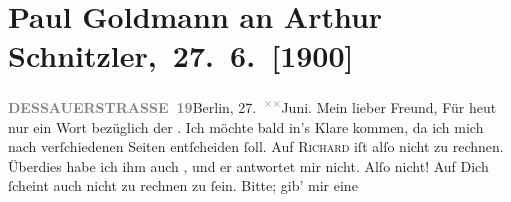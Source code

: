 

         
         \renewcommand{\erwaehntePersonen}{Personen: Richard Beer-Hofmann, Robert Hirschfeld, Leo Van-Jung}
         \renewcommand{\erwaehnteInstitutionen}{Institutionen: Houghton Library}
         \renewcommand{\erwaehnteOrte}{Orte: Alpen, Altaussee, Berlin, Dessauer Straße, Salzburg, Sekirn, Südtirol}
         \renewcommand{\erwaehnteWerke}{Werke: Tagebuch}
               \section[ Paul Goldmann an Arthur Schnitzler, 27. 6. {[}1900{]}]{ Paul Goldmann an Arthur Schnitzler, 27. 6. {[}1900{]}}\nopagebreak{}\rehead{ }\begin{ledgroupsized}[t]{13cm}\normalsize\beginnumbering \toendnotes[C]{\smallbreak\pagebreak[2]} 
\toendnotes[C]{\smallbreak}\pstart
           \noindent{}{\pb}\textcolor{gray}{\textbf{DESSAUERSTRASSE 19}}\hfill Berlin, 27. \substVorne{}\textsuperscript{\textcolor{gray}{×}\-\textcolor{gray}{×}}\substDazwischen{}Ju\substHinten{}ni.\pend
           \pstart\center{}Mein lieber Freund,\pend\pstart
           Für heut nur ein Wort bezüglich der \label{K_L02922-2v}\label{K_L02922-2h}. Ich möchte bald in’s Klare kommen, da ich mich nach verſchiedenen Seiten
               entſcheiden ſoll. Auf \textsc{Richard} iſt alſo nicht zu rechnen. Überdies habe ich \strikeout{\textcolor{gray}{dir}} ihm auch \label{K_L02922-1v}\label{K_L02922-1h}, und er
               antwortet mir nicht. Alſo nicht! Auf Dich ſcheint auch nicht {\pb}zu rechnen zu ſein. Bitte; gib’ mir eine

\end{ledgroupsized}
